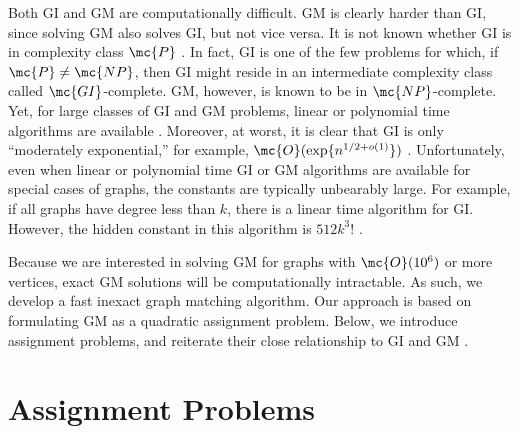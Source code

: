 \documentclass[10pt,journal,cspaper,compsoc]{IEEEtran}
\begin{document}
Both GI and GM are computationally difficult. GM is clearly harder than GI, since solving GM also solves GI, but not vice versa. It is not known whether GI is in complexity class $\mc{P}$ \cite{Fortin1996}.  In fact, GI is one of the few problems for which, if $\mc{P} \neq \mc{NP}$, then GI might reside in an intermediate complexity class called $\mc{GI}$-complete.  GM, however, is known to be in $\mc{NP}$-complete.    
Yet, for large classes of GI and GM problems, linear or polynomial time algorithms are available \cite{Babai1980}.  Moreover, at worst, it is clear that GI is only ``moderately exponential,'' for example, $\mc{O}(\exp\{n^{1/2 + o(1)}\})$ \cite{Babai1981}.  Unfortunately, even when linear or polynomial time GI or GM algorithms are available for special cases of graphs, the constants are typically unbearably large.  For example, if all graphs have degree less than $k$, there is a linear time algorithm for GI.  However, the hidden constant in this algorithm is $512k^3!$ \cite{Chen1994}.  

Because we are interested in solving GM for graphs with $\mc{O}(10^6)$ or more vertices, exact GM solutions will be computationally intractable. As such, we develop a fast inexact graph matching algorithm.   Our approach is based on formulating GM as a quadratic assignment problem.  Below, we introduce assignment problems, and reiterate their close relationship to GI and GM \cite{Burkard2009}.



\section{Assignment Problems} %
\label{sub:assignment_problems}
\end{document}
